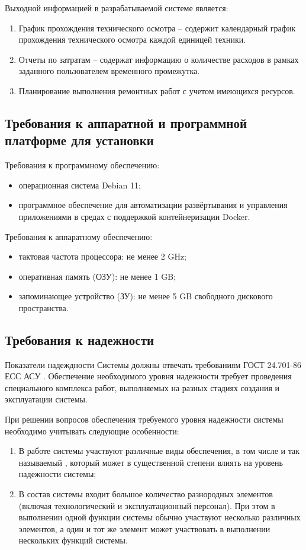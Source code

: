 Выходной информацией в разрабатываемой системе является:
\begin{enumerate}
  \item График прохождения технического осмотра -- содержит календарный график
    прохождения технического осмотра каждой единицей техники.
  \item Отчеты по затратам -- содержат информацию о количестве расходов в
    рамках заданного пользователем временного промежутка.
  \item Планирование выполнения ремонтных работ с учетом имеющихся
    ресурсов.
\end{enumerate}


\subsection{Требования к аппаратной и программной платформе для установки}
Требования к программному обеспечению:
\begin{itemize}
  \item операционная система Debian 11;
  \item программное обеспечение для автоматизации развёртывания и управления
    приложениями в средах с поддержкой контейнеризации Docker.
\end{itemize}

Требования к аппаратному обеспечению:
\begin{itemize}
  \item тактовая частота процессора: не менее 2 GHz;
  \item оперативная память (ОЗУ): не менее 1 GB;
  \item запоминающее устройство (ЗУ): не менее 5 GB свободного дискового
    пространства.
\end{itemize}


\subsection{Требования к надежности}
Показатели надеждности Системы должны отвечать требованиям ГОСТ 24.701-86 ЕСС
АСУ . Обеспечение необходимого уровня надежности требует проведения
специального комплекса работ, выполняемых на разных стадиях создания и
эксплуатации системы.

При решении вопросов обеспечения требуемого уровня надежности системы необходимо
учитывать следующие особенности:
\begin{enumerate}
  \item В работе системы участвуют различные виды обеспечения, в том числе и так
    называемый , который может в существенной
    степени влиять на уровень надежности системы;
  \item В состав системы входит большое количество разнородных элементов
    (включая технологический и эксплуатационный персонал). При этом в
    выполнении одной функции системы обычно участвуют несколько различных
    элементов, а один и тот же элемент может участвовать в выполнении нескольких
    функций системы.
\end{enumerate}

